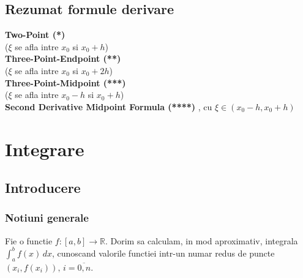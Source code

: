 \documentclass{article}
\newenvironment{mdframe16cm}{%
    \begin{mdframed}[nobreak,userdefinedwidth=16cm]
}{%
    \end{mdframed}%
}%
\begin{document}
\subsection{Rezumat formule derivare}
\begin{mdframe16cm}
    \vspace{0.25cm}\tabto{0.5cm}\textbf{Two-Point (*)}\\
    
    \tabto{1cm} ($\xi$ se afla intre $x_0$ si $x_0+h$)\\
    
    \tabto{0.5cm}\textbf{Three-Point-Endpoint (**)}\\
    
    \tabto{1cm} ($\xi$ se afla intre $x_0$ si $x_0+2h$)\\
    
    \tabto{0.5cm}\textbf{Three-Point-Midpoint (***)}\\
    
    \tabto{1cm} ($\xi$ se afla intre $x_0-h$ si $x_0+h$)\\
    
    \tabto{0.5cm}\textbf{Second Derivative Midpoint Formula (****)}
    \tabto{1cm}, cu $\xi \in (x_0-h, x_0+h)$
\end{mdframe16cm}



\section{Integrare}


\subsection{Introducere}
\subsubsection{Notiuni generale}
\tab Fie o functie $f:[a,b]\rightarrow\mathbb{R}$. Dorim sa calculam, in mod aproximativ, integrala $\int_a^b f(x)\, dx$, cunoscand valorile functiei intr-un numar redus de puncte $(x_i, f(x_i)), \, i = \overline{0, n}$.
\end{document}
